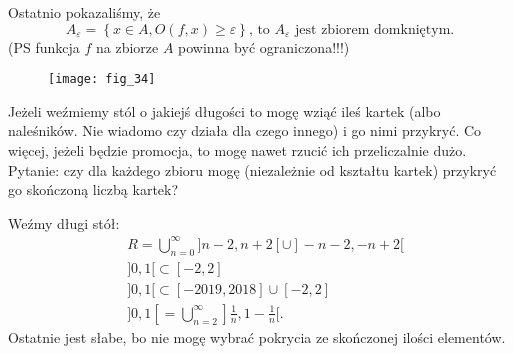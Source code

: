 \documentclass[../main.tex]{subfiles}
\begin{document}
    Ostatnio pokazaliśmy, że
    \[
        A_{\varepsilon} = \left\{ x\in A, O(f,x) \ge \varepsilon \right\} \text{, to $A_\varepsilon$ jest zbiorem domkniętym}
    .\]
    (PS funkcja $f$ na zbiorze $A$ powinna być ograniczona!!!)
    \begin{figure}[h]
        \centering
        \texttt{[image: fig\_34]}
    \end{figure}

    \begin{obserwacja}
        Jeżeli weźmiemy stól o jakiejś długości to mogę wziąć ileś kartek (albo naleśników. Nie wiadomo czy działa dla czego innego) i go nimi przykryć. Co więcej, jeżeli będzie promocja, to mogę nawet rzucić ich przeliczalnie dużo. Pytanie: czy dla każdego zbioru mogę (niezależnie od kształtu kartek) przykryć go skończoną liczbą kartek?
    \end{obserwacja}

    Weźmy długi stół:
    \begin{align*}
        &R = \bigcup_{n=0}^\infty ] n-2, n+2 [ \cup ]-n-2, -n+2[\\
        &]0,1[ \subset [-2,2]\\
        &]0,1[ \subset [-2019,2018]\cup[-2,2]\\
        &]0,1[ = \bigcup_{n=2}^\infty ]\frac{1}{n},1-\frac{1}{n}[
    .\end{align*}
    Ostatnie jest słabe, bo nie mogę wybrać pokrycia ze skończonej ilości elementów.
\end{document}
